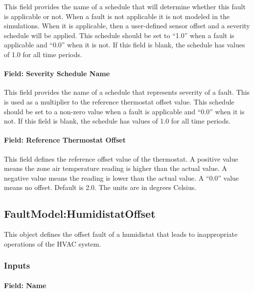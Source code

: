 This field provides the name of a schedule that will determine whether this fault is applicable or not. When a fault is not applicable it is not modeled in the simulations. When it is applicable, then a user-defined sensor offset and a severity schedule will be applied. This schedule should be set to ``1.0'' when a fault is applicable and ``0.0'' when it is not. If this field is blank, the schedule has values of 1.0 for all time periods.

\paragraph{Field: Severity Schedule Name}\label{field-severity-schedule-name-6}

This field provides the name of a schedule that represents severity of a fault. This is used as a multiplier to the reference thermostat offset value. This schedule should be set to a non-zero value when a fault is applicable and ``0.0'' when it is not. If this field is blank, the schedule has values of 1.0 for all time periods.

\paragraph{Field: Reference Thermostat Offset}\label{field-reference-thermostat-offset}

This field defines the reference offset value of the thermostat. A positive value means the zone air temperature reading is higher than the actual value. A negative value means the reading is lower than the actual value. A ``0.0'' value means no offset. Default is 2.0. The units are in degrees Celsius.

\subsection{FaultModel:HumidistatOffset}\label{faultmodelhumidistatoffset}

This object defines the offset fault of a humidistat that leads to inappropriate operations of the HVAC system.

\subsubsection{Inputs}\label{inputs-7-015}

\paragraph{Field: Name}\label{field-name-7-011}

